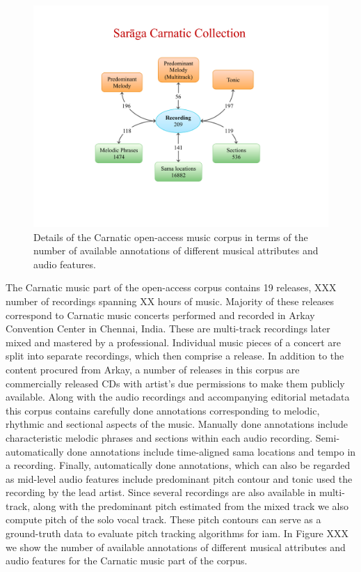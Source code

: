 \begin{figure}
	\begin{center}
		\includegraphics[width=\figSizeNinety]{ch04_datasets/figures/carnatic_CC_details.pdf}
	\end{center}
	\caption{Details of the Carnatic open-access music corpus in terms of the number of available annotations of different musical attributes and audio features.}
	\label{fig:carnatic_open_access_corpus_details}
\end{figure}


The Carnatic music part of the open-access corpus contains 19 releases, XXX number of recordings spanning XX hours of music. Majority of these releases correspond to Carnatic music concerts performed and recorded in Arkay Convention Center in Chennai, India. These are multi-track recordings later mixed and mastered by a professional. Individual music pieces of a concert are split into separate recordings, which then comprise a release. In addition to the content procured from Arkay, a number of releases in this corpus are commercially released CDs with artist's due permissions to make them publicly available. Along with the audio recordings and accompanying editorial metadata this corpus contains carefully done annotations corresponding to melodic, rhythmic and sectional aspects of the music. Manually done annotations include characteristic melodic phrases and sections within each audio recording. Semi-automatically done annotations include time-aligned sama locations and tempo in a recording. Finally, automatically done annotations, which can also be regarded as mid-level audio features include predominant pitch contour and tonic used the recording by the lead artist. Since several recordings are also available in multi-track, along with the predominant pitch estimated from the mixed track we also compute pitch of the solo vocal track. These pitch contours can serve as a ground-truth data to evaluate pitch tracking algorithms for \gls{iam}. In Figure XXX we show the number of available annotations of different musical attributes and audio features for the Carnatic music part of the corpus.


